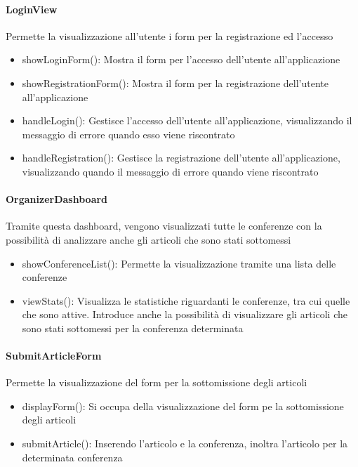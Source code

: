 \paragraph{LoginView}
Permette la visualizzazione all'utente i form per la registrazione ed l'accesso\\
\begin{itemize}
\item showLoginForm(): Mostra il form per l'accesso dell'utente all'applicazione\\
\item showRegistrationForm(): Mostra il form per la registrazione dell'utente all'applicazione\\
\item handleLogin(): Gestisce l'accesso dell'utente all'applicazione, visualizzando il messaggio di errore quando esso viene riscontrato\\
\item handleRegistration(): Gestisce la registrazione dell'utente all'applicazione, visualizzando quando il messaggio di errore quando viene riscontrato\\
\end{itemize}

\paragraph{OrganizerDashboard}
Tramite questa dashboard, vengono visualizzati tutte le conferenze con la possibilità di analizzare anche gli articoli che sono stati sottomessi\\
\begin{itemize}
\item showConferenceList(): Permette la visualizzazione tramite una lista delle conferenze\\
\item viewStats(): Visualizza le statistiche riguardanti le conferenze, tra cui quelle che sono attive. Introduce anche la possibilità di visualizzare gli articoli che sono stati sottomessi per la conferenza determinata\\
\end{itemize}

\paragraph{SubmitArticleForm}
Permette la visualizzazione del form per la sottomissione degli articoli\\
\begin{itemize}
\item displayForm(): Si occupa della visualizzazione del form pe la sottomissione degli articoli\\
\item submitArticle(): Inserendo l'articolo e la conferenza, inoltra l'articolo per la determinata conferenza\\
\end{itemize}

